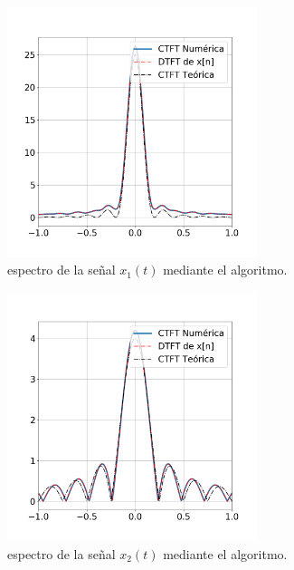 \documentclass[11pt,a4paper]{article}
\begin{document}
    \begin{figure}[H]
    \centering
    \includegraphics[width=0.65\textwidth]{Img/punto_4_h_1.png}
    \caption{espectro de la señal $x_{1}(t)$ mediante el algoritmo.}
    \label{fig.4hi}
    \end{figure} 


    \begin{figure}[H]
    \centering
    \includegraphics[width=0.65\textwidth]{Img/punto_4_h_2.png}
    \caption{espectro de la señal $x_{2}(t)$ mediante el algoritmo.}
    \label{fig.4hii}
    \end{figure}
\end{document}
